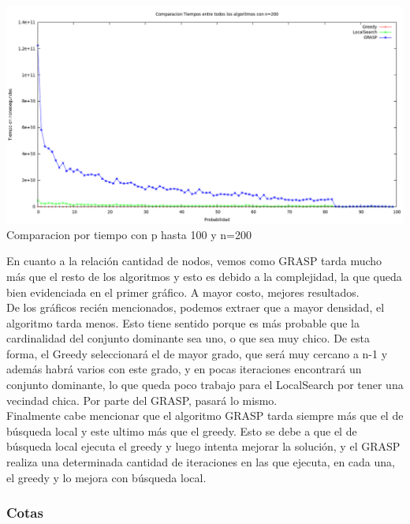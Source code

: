 \begin{center}
\includegraphics[width=17cm]{./graficos/comparaciontiemposprobvariablen200.png}\\
Comparacion por tiempo con p hasta 100 y n=200
\end{center}

En cuanto a la relación cantidad de nodos, vemos como GRASP tarda mucho más que el resto de los algoritmos 
y esto es debido a la complejidad, la que queda bien evidenciada en el primer gráfico. A mayor costo, mejores resultados.\\
De los gráficos recién mencionados, podemos extraer que a mayor densidad, el algoritmo tarda menos.
Esto tiene sentido porque es más probable que la cardinalidad del conjunto dominante sea uno, o que sea muy chico.
De esta forma, el Greedy seleccionará el de mayor grado, que será muy cercano a n-1 y además habrá varios con este grado, y en pocas iteraciones
encontrará un conjunto dominante, lo que queda poco trabajo para el LocalSearch por tener una vecindad chica.
Por parte del GRASP, pasará lo mismo.\\
Finalmente cabe mencionar que el algoritmo GRASP tarda siempre más que el de búsqueda local y este ultimo más que el
greedy. Esto se debe a que el de búsqueda local ejecuta el greedy y luego intenta mejorar la solución, y el GRASP realiza una
determinada cantidad de iteraciones en las que ejecuta, en cada una, el greedy y lo mejora con búsqueda local.

\subsubsection{Cotas}

